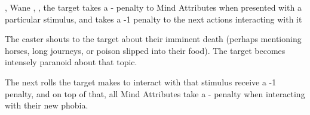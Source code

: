   {\mWater, \mFate}%
  {Wane}%
  {\distant, \detailed, \divergent}%
  {}%
  {the target takes a - penalty to Mind Attributes when presented with a particular stimulus, and takes a -1 penalty to the next  actions interacting with it}%
  {
    The caster shouts to the target about their imminent death (perhaps mentioning horses, long journeys, or poison slipped into their food).
    The target becomes intensely paranoid about that topic.

    The next  rolls the target makes to interact with that stimulus receive a -1 penalty, and on top of that, all Mind Attributes take a - penalty when interacting with their new phobia.
  }
